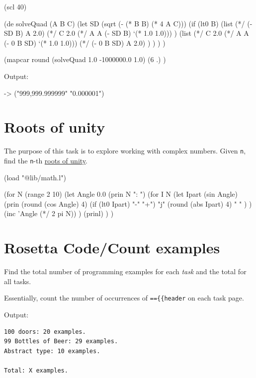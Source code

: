 \begin{wideverbatim}

(scl 40)

(de solveQuad (A B C)
   (let SD (sqrt (- (* B B) (* 4 A C)))
      (if (lt0 B)
         (list
            (*/ (- SD B) A 2.0)
            (*/ C 2.0 (*/ A A (- SD B) `(* 1.0 1.0))) )
         (list
            (*/ C 2.0 (*/ A A (- 0 B SD) `(* 1.0 1.0)))
            (*/ (- 0 B SD) A 2.0) ) ) ) )

(mapcar round
   (solveQuad 1.0 -1000000.0 1.0)
   (6 .) )

Output:

-> ("999,999.999999" "0.000001")

\end{wideverbatim}

\pagebreak{}
\section*{Roots of unity}

The purpose of this task is to explore working with complex numbers.
Given \texttt{n}, find the \texttt{n}-th
\href{http://en.wikipedia.org/wiki/Roots\_of\_unity}{roots of unity}.

\begin{wideverbatim}

(load "@lib/math.l")

(for N (range 2 10)
   (let Angle 0.0
      (prin N ": ")
      (for I N
         (let Ipart (sin Angle)
            (prin
               (round (cos Angle) 4)
               (if (lt0 Ipart) "-" "+")
               "j"
               (round (abs Ipart) 4)
               "  " ) )
         (inc 'Angle (*/ 2 pi N)) )
      (prinl) ) )

\end{wideverbatim}

\pagebreak{}
\section*{Rosetta Code/Count examples}


Find the total number of programming examples for each
\emph{task} and the total for all
tasks.

Essentially, count the number of occurrences of
\texttt{==\{\{header\textbar{}} on each task page.

Output:

\begin{verbatim}
100 doors: 20 examples.
99 Bottles of Beer: 29 examples.
Abstract type: 10 examples.

Total: X examples.
\end{verbatim}

